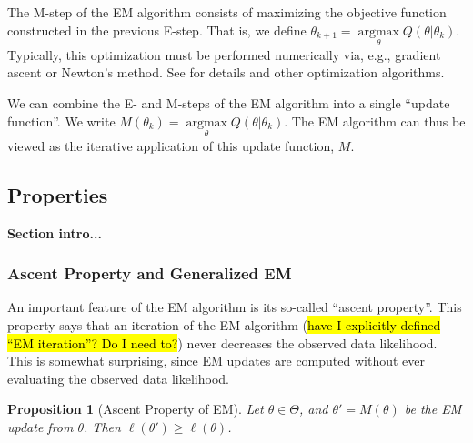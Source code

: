 \documentclass[11pt, oneside]{article}   	%
\DeclareMathOperator*{\argmax}{argmax}
\newtheorem{proposition}{Proposition}[section]
\begin{document}
The M-step of the EM algorithm consists of maximizing the objective function constructed in the previous E-step. That is, we define $\theta_{k+1} = \argmax\limits_\theta Q(\theta|\theta_k)$. Typically, this optimization must be performed numerically via, e.g., gradient ascent or Newton's method. See \citet{Noc06} for details and other optimization algorithms. 

We can combine the E- and M-steps of the EM algorithm into a single ``update function''. We write $M(\theta_k) = \argmax\limits_\theta Q(\theta|\theta_k)$. The EM algorithm can thus be viewed as the iterative application of this update function, $M$.

\subsection{Properties}

\textbf{Section intro...}

\subsubsection{Ascent Property and Generalized EM}

An important feature of the EM algorithm is its so-called ``ascent property''. This property says that an iteration of the EM algorithm (\hl{have I explicitly defined ``EM iteration''? Do I need to?}) never decreases the observed data likelihood. This is somewhat surprising, since EM updates are computed without ever evaluating the observed data likelihood. 

\begin{proposition}[Ascent Property of EM]
    Let $\theta \in \Theta$, and $\theta' = M(\theta)$ be the EM update from $\theta$. Then $\ell(\theta') \geq \ell(\theta)$.
\end{proposition}
\end{document}
